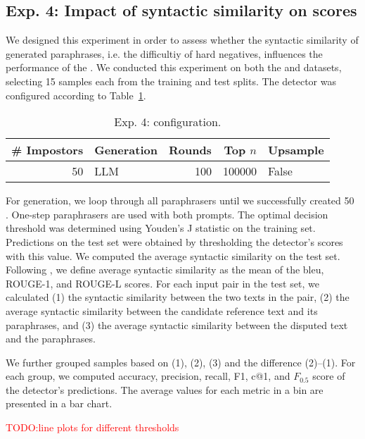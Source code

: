 \subsection{Exp. 4: Impact of syntactic similarity on \impAppr{} scores}
\label{sec:syn_sim_impact_}

We designed this experiment in order to assess whether the syntactic similarity of generated paraphrases, i.e. the difficultiy of hard negatives, influences the performance of the \impAppr{}.
We conducted this experiment on both the \dataBlog{} and \dataStudent{} datasets, selecting 15 samples each from the training and test splits. 
The detector was configured according to Table~\ref{tab:imp_syn_sim_config}.

\begin{table}[h]
\centering\small
\caption{Exp. 4: \impAppr{} configuration.}
\label{tab:imp_syn_sim_config}
\begin{tabular}{@{}rlrrl@{}}   %
\toprule
\# Impostors & Generation & Rounds & Top $n$ & Upsample \\
\midrule
50 & LLM & 100 & \num{100000} & False \\
\bottomrule
\end{tabular}%
\end{table}

For generation, we loop through all paraphrasers until we successfully created 50 \imps{}.
One-step paraphrasers are used with both prompts.
The optimal decision threshold was determined using Youden’s J statistic on the training set. 
Predictions on the test set were obtained by thresholding the detector’s scores with this value.
We computed the average syntactic similarity on the test set. 
Following \citet{gohsen_captions_2023}, we define average syntactic similarity as the mean of the  \ac{bleu}, ROUGE-1, and ROUGE-L scores. 
For each input pair in the test set, we calculated
(1) the syntactic similarity between the two texts in the pair, (2) the average syntactic similarity between the candidate reference text and its paraphrases, and (3) the average syntactic similarity between the disputed text and the paraphrases.

We further grouped samples based on (1), (2), (3) and the difference (2)–(1). 
For each group, we computed accuracy, precision, recall, F1, c@1, and $F_{0.5}$ score of the detector’s predictions. 
The average values for each metric in a bin are presented in a bar chart.

\textcolor{red}{TODO:line plots for different thresholds}
